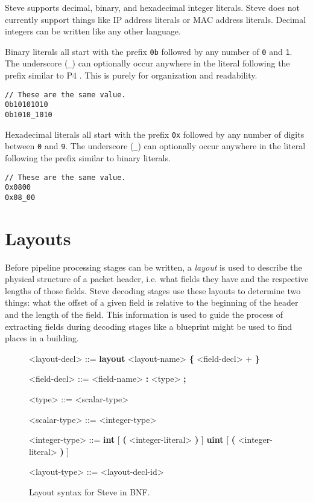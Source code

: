 Steve supports decimal, binary, and hexadecimal integer literals. Steve does not currently support things like IP address literals or MAC address literals. Decimal integers can be written like any other language.

Binary literals all start with the prefix \texttt{0b} followed by any number of \texttt{0} and \texttt{1}. The underscore (\texttt{\_}) can optionally occur anywhere in the literal following the prefix similar to P4 \cite{p4_spec}. This is purely for organization and readability.

\begin{lstlisting}
// These are the same value.
0b10101010
0b1010_1010
\end{lstlisting}

Hexadecimal literals all start with the prefix \texttt{0x} followed by any number of digits between \texttt{0} and \texttt{9}. The underscore (\texttt{\_}) can optionally occur anywhere in the literal following the prefix similar to binary literals.

\begin{lstlisting}
// These are the same value.
0x0800
0x08_00
\end{lstlisting}

\section{Layouts} \label{layout_tut}

Before pipeline processing stages can be written, a \textit{layout} is used to describe the physical structure of a packet header, i.e. what fields they have and the respective lengths of those fields. Steve decoding stages use these layouts to determine two things: what the offset of a given field is relative to the beginning of the header and the length of the field. This information is used to guide the process of extracting fields during decoding stages like a blueprint might be used to find places in a building.

\begin{figure}[ht]
\begin{mdframed}
\begin{grammar}

<layout-decl> ::=
\textbf{layout} <layout-name> 
\textbf{\{}
	<field-decl> +
\textbf{\}}

<field-decl> ::=
<field-name> \textbf{:} <type> \textbf{;}

<type> ::=
<scalar-type>

<scalar-type> ::= <integer-type>

<integer-type> ::=
\textbf{int} [ \textbf{(} <integer-literal> \textbf{)} ]
\alt \textbf{uint} [ \textbf{(} <integer-literal> \textbf{)} ]

<layout-type> ::=
<layout-decl-id>

\end{grammar}
\end{mdframed}
\caption{Layout syntax for Steve in BNF.}
\label{fg:layout_syntax}
\end{figure}


